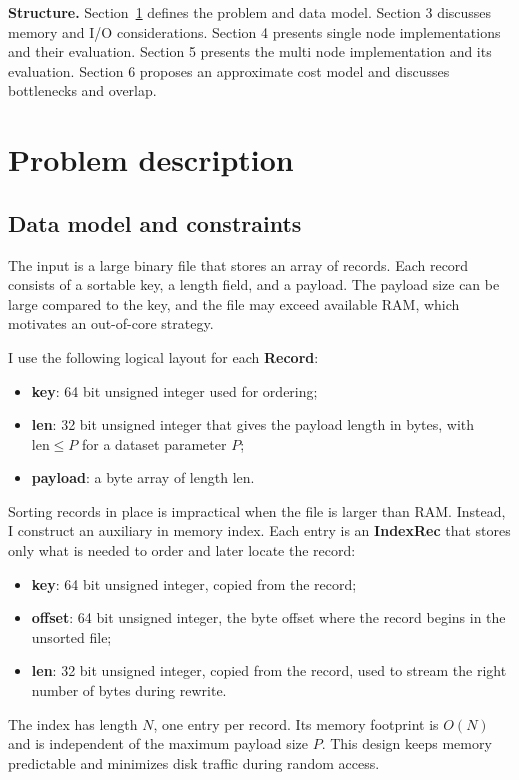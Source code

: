 \documentclass[12pt]{article}
\begin{document}
\textbf{Structure.}
Section~\ref{sec:problem} defines the problem and data model. Section 3 discusses memory and I/O considerations. Section 4 presents single node implementations and their evaluation. Section 5 presents the multi node implementation and its evaluation. Section 6 proposes an approximate cost model and discusses bottlenecks and overlap.

\section{Problem description}
\label{sec:problem}

\subsection{Data model and constraints}
The input is a large binary file that stores an array of records. Each record consists of a sortable key, a length field, and a payload. The payload size can be large compared to the key, and the file may exceed available RAM, which motivates an out-of-core strategy.

I use the following logical layout for each \textbf{Record}:
\begin{itemize}
  \item \textbf{key}: 64 bit unsigned integer used for ordering;
  \item \textbf{len}: 32 bit unsigned integer that gives the payload length in bytes, with \(\text{len} \le P\) for a dataset parameter \(P\);
  \item \textbf{payload}: a byte array of length \(\text{len}\).
\end{itemize}

Sorting records in place is impractical when the file is larger than RAM. Instead, I construct an auxiliary in memory index. Each entry is an \textbf{IndexRec} that stores only what is needed to order and later locate the record:
\begin{itemize}
  \item \textbf{key}: 64 bit unsigned integer, copied from the record;
  \item \textbf{offset}: 64 bit unsigned integer, the byte offset where the record begins in the unsorted file;
  \item \textbf{len}: 32 bit unsigned integer, copied from the record, used to stream the right number of bytes during rewrite.
\end{itemize}
The index has length \(N\), one entry per record. Its memory footprint is \(O(N)\) and is independent of the maximum payload size \(P\). This design keeps memory predictable and minimizes disk traffic during random access.
\end{document}
